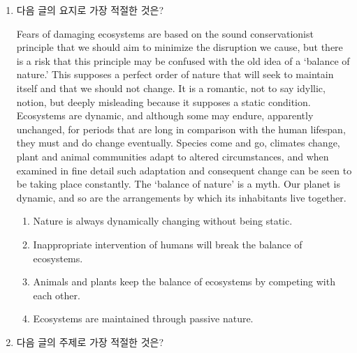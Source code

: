 \documentclass[9pt, a4paper, twocolumn]{oblivoir}
\begin{document}
    
    \begin{enumerate}     
        \item 다음 글의 요지로 가장 적절한 것은?
        
        Fears of damaging ecosystems are based on the sound
        conservationist principle that we should aim to minimize the
        disruption we cause, but there is a risk that this principle
        may be confused with the old idea of a ‘balance of nature.’
        This supposes a perfect order of nature that will seek to
        maintain itself and that we should not change. It is a
        romantic, not to say idyllic, notion, but deeply misleading
        because it supposes a static condition. Ecosystems are
        dynamic,
        and
        although
        some
        may
        endure,
        apparently
        unchanged, for periods that are long in comparison with the
        human lifespan, they must and do change eventually. Species
        come and go, climates change, plant and animal communities
        adapt to altered circumstances, and when examined in fine
        detail such adaptation and consequent change can be seen to
        be taking place constantly. The ‘balance of nature’ is a
        myth. Our planet is dynamic, and so are the arrangements
        by which its inhabitants live together. 

        \begin{enumerate}
            \item Nature is always dynamically changing without being static. %
            \item Inappropriate intervention of humans will break the balance of ecosystems.
            \item Animals and plants keep the balance of ecosystems by competing with each other.
            \item Ecosystems are maintained through passive nature.
        \end{enumerate}
 
\pagebreak
        
        \item 다음 글의 주제로 가장 적절한 것은? 


\end{enumerate}
\end{document}
